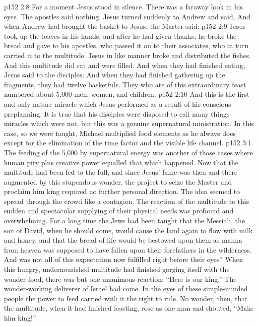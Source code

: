 \vs p152 2:8 For a moment Jesus stood in silence. There was a faraway look in his eyes. The apostles said nothing. Jesus turned suddenly to Andrew and said,  And when Andrew had brought the basket to Jesus, the Master said: 
\vs p152 2:9 Jesus took up the loaves in his hands, and after he had given thanks, he broke the bread and gave to his apostles, who passed it on to their associates, who in turn carried it to the multitude. Jesus in like manner broke and distributed the fishes. And this multitude did eat and were filled. And when they had finished eating, Jesus said to the disciples:  And when they had finished gathering up the fragments, they had twelve basketfuls. They who ate of this extraordinary feast numbered about 5,000 men, women, and children.
\vs p152 2:10 \pc And this is the first and only nature miracle which Jesus performed as a result of his conscious preplanning. It is true that his disciples were disposed to call many things miracles which were not, but this was a genuine supernatural ministration. In this case, so we were taught, Michael multiplied food elements as he always does except for the elimination of the time factor and the visible life channel.
\vs p152 3:1 The feeding of the 5,000 by supernatural energy was another of those cases where human pity plus creative power equalled that which happened. Now that the multitude had been fed to the full, and since Jesus’ fame was then and there augmented by this stupendous wonder, the project to seize the Master and proclaim him king required no further personal direction. The idea seemed to spread through the crowd like a contagion. The reaction of the multitude to this sudden and spectacular supplying of their physical needs was profound and overwhelming. For a long time the Jews had been taught that the Messiah, the son of David, when he should come, would cause the land again to flow with milk and honey, and that the bread of life would be bestowed upon them as manna from heaven was supposed to have fallen upon their forefathers in the wilderness. And was not all of this expectation now fulfilled right before their eyes? When this hungry, undernourished multitude had finished gorging itself with the wonder\hyp{}food, there was but one unanimous reaction: “Here is our king.” The wonder\hyp{}working deliverer of Israel had come. In the eyes of these simple\hyp{}minded people the power to feed carried with it the right to rule. No wonder, then, that the multitude, when it had finished feasting, rose as one man and shouted, “Make him king!”
